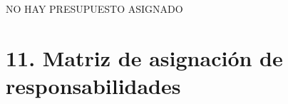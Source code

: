 \documentclass[11pt]{charter}
\begin{document}
NO HAY PRESUPUESTO ASIGNADO

\newpage
\section{11. Matriz de asignación de responsabilidades}
\label{sec:responsabilidades}

\end{document}
